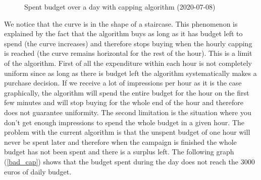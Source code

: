 \documentclass[12pt]{article}
\begin{document}
\begin{figure}[h!]
	\centering
	\caption{Spent budget over a day with capping algorithm (2020-07-08)}
	\label{good_cap}
\end{figure}

We notice that the curve is in the shape of a staircase. This phenomenon is explained by the fact that the algorithm buys as long as it has budget left to spend (the curve increases) and therefore stops buying when the hourly capping is reached (the curve remains horizontal for the rest of the hour). This is a limit of the algorithm. First of all the expenditure within each hour is not completely uniform since as long as there is budget left the algorithm systematically makes a purchase decision. If we receive a lot of impressions per hour as it is the case graphically, the algorithm will spend the entire budget for the hour on the first few minutes and will stop buying for the whole end of the hour and therefore does not guarantee uniformity. The second limitation is the situation where you don't get enough impressions to spend the whole budget in a given hour. The problem with the current algorithm is that the unspent budget of one hour will never be spent later and therefore when the campaign is finished the whole budget has not been spent and there is a surplus left. The following graph (\autoref{bad_cap}) shows that the budget spent during the day does not reach the 3000 euros of daily budget. 
\end{document}
